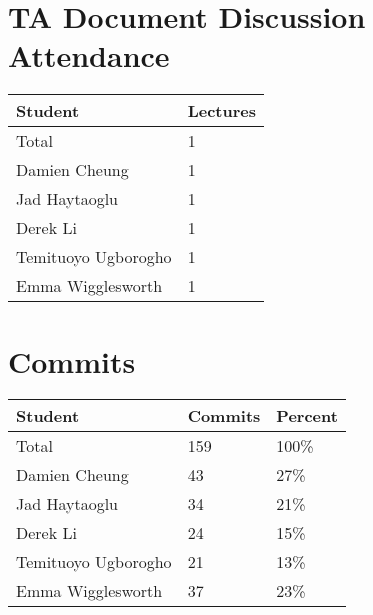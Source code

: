 \documentclass{article}
\begin{document}
\section{TA Document Discussion Attendance}


\begin{table}[H]
    \centering
    \begin{tabular}{ll}
        \toprule
        \textbf{Student} & \textbf{Lectures} \\
        \midrule
        Total            & 1               \\
        Damien Cheung & 1\\
        Jad Haytaoglu & 1\\
        Derek Li & 1\\
        Temituoyo Ugborogho & 1\\
        Emma Wigglesworth & 1\\
        \bottomrule
    \end{tabular}
\end{table}

\section{Commits}


\begin{table}[H]
    \centering
    \begin{tabular}{lll}
        \toprule
        \textbf{Student} & \textbf{Commits} & \textbf{Percent} \\
        \midrule
        Total            & 159              & 100\%            \\
        Damien Cheung          & 43              & 27\%               \\
        Jad Haytaoglu           & 34              & 21\%               \\
        Derek Li           & 24              & 15\%               \\
        Temituoyo Ugborogho           & 21              & 13\%               \\
        Emma Wigglesworth           & 37              & 23\%               \\
        \bottomrule
    \end{tabular}
\end{table}
\end{document}

